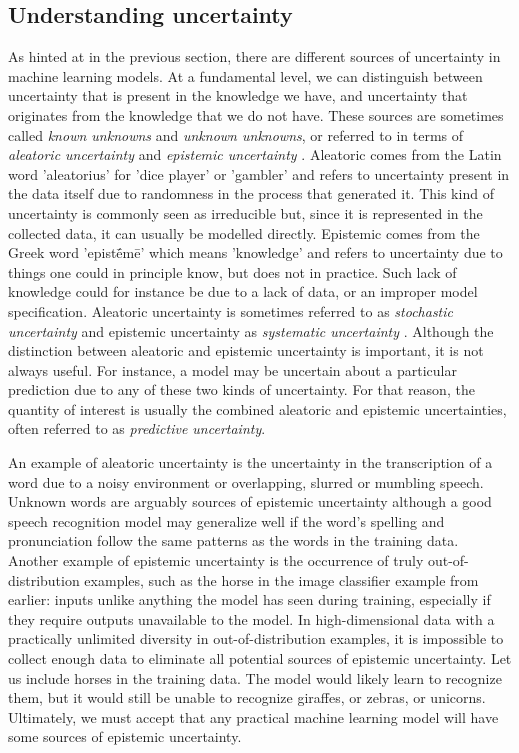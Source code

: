 \subsection{Understanding uncertainty}
% 
% 
As hinted at in the previous section, there are different sources of uncertainty in machine learning models. 
At a fundamental level, we can distinguish between uncertainty that is present in the knowledge we have, and uncertainty that originates from the knowledge that we do not have.
These sources are sometimes called \emph{known unknowns} and \emph{unknown unknowns}, or referred to in terms of \textit{aleatoric uncertainty} and \textit{epistemic uncertainty} \cite{kendall_what_2017}. 
Aleatoric comes from the Latin word 'aleatorius' for 'dice player' or 'gambler' and refers to uncertainty present in the data itself due to randomness in the process that generated it. This kind of uncertainty is commonly seen as irreducible but, since it is represented in the collected data, it can usually be modelled directly. 
Epistemic comes from the Greek word 'epistḗmē' which means 'knowledge' and refers to uncertainty due to things one could in principle know, but does not in practice. Such lack of knowledge could for instance be due to a lack of data, or an improper model specification. 
Aleatoric uncertainty is sometimes referred to as \textit{stochastic uncertainty} and epistemic uncertainty as \textit{systematic uncertainty} \cite{kendall_what_2017}. 
Although the distinction between aleatoric and epistemic uncertainty is important, it is not always useful. For instance, a model may be uncertain about a particular prediction due to any of these two kinds of uncertainty. For that reason, the quantity of interest is usually the combined aleatoric and epistemic uncertainties, often referred to as \textit{predictive uncertainty}. 

An example of aleatoric uncertainty is the uncertainty in the transcription of a word due to a noisy environment or overlapping, slurred or mumbling speech. 
Unknown words are arguably sources of epistemic uncertainty although a good speech recognition model may generalize well if the word's spelling and pronunciation follow the same patterns as the words in the training data. Another example of epistemic uncertainty is the occurrence of truly out-of-distribution examples, such as the horse in the image classifier example from earlier: inputs unlike anything the model has seen during training, especially if they require outputs unavailable to the model. 
In high-dimensional data with a practically unlimited diversity in out-of-distribution examples, it is impossible to collect enough data to eliminate all potential sources of epistemic uncertainty. Let us include horses in the training data. The model would likely learn to recognize them, but it would still be unable to recognize giraffes, or zebras, or unicorns. 
Ultimately, we must accept that any practical machine learning model will have some sources of epistemic uncertainty. 

